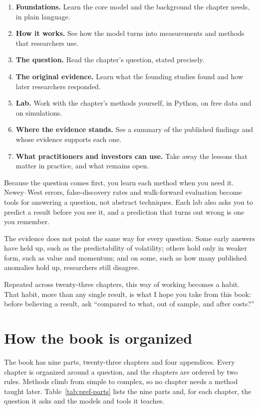 \begin{enumerate}
  \item \textbf{Foundations.} Learn the core model and the background the chapter needs, in plain language.
  \item \textbf{How it works.} See how the model turns into measurements and methods that researchers use.
  \item \textbf{The question.} Read the chapter's question, stated precisely.
  \item \textbf{The original evidence.} Learn what the founding studies found and how later researchers responded.
  \item \textbf{Lab.} Work with the chapter's methods yourself, in Python, on free data and on simulations.
  \item \textbf{Where the evidence stands.} See a summary of the published findings and whose evidence supports each one.
  \item \textbf{What practitioners and investors can use.} Take away the lessons that matter in practice, and what remains open.
\end{enumerate}

Because the question comes first, you learn each method when you need it. Newey–West errors, false-discovery rates and walk-forward evaluation become tools for answering a question, not abstract techniques. Each lab also asks you to predict a result before you see it, and a prediction that turns out wrong is one you remember.

The evidence does not point the same way for every question. Some early answers have held up, such as the predictability of volatility; others hold only in weaker form, such as value and momentum; and on some, such as how many published anomalies hold up, researchers still disagree.

Repeated across twenty-three chapters, this way of working becomes a habit. That habit, more than any single result, is what I hope you take from this book: before believing a result, ask ``compared to what, out of sample, and after costs?''


\section*{How the book is organized}

The book has nine parts, twenty-three chapters and four appendices. Every chapter is organized around a question, and the chapters are ordered by two rules. Methods climb from simple to complex, so no chapter needs a method taught later. 
Table~\ref{tab:pref-parts} lists the nine parts and, for each chapter, the question it asks and the models and tools it teaches.

